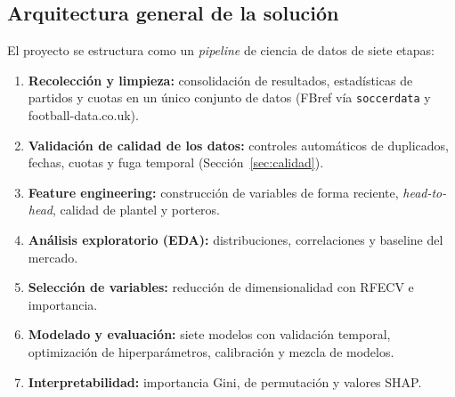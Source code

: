 \documentclass{ieeeaccess}
\begin{document}
\subsection{Arquitectura general de la solución}
El proyecto se estructura como un \textit{pipeline} de ciencia de datos de siete etapas:
\begin{enumerate}
\item \textbf{Recolección y limpieza:} consolidación de resultados, estadísticas de partidos y cuotas en un único conjunto de datos (FBref vía \texttt{soccerdata} y football-data.co.uk).
\item \textbf{Validación de calidad de los datos:} controles automáticos de duplicados, fechas, cuotas y fuga temporal (Sección~\ref{sec:calidad}).
\item \textbf{Feature engineering:} construcción de variables de forma reciente, \textit{head-to-head}, calidad de plantel y porteros.
\item \textbf{Análisis exploratorio (EDA):} distribuciones, correlaciones y baseline del mercado.
\item \textbf{Selección de variables:} reducción de dimensionalidad con RFECV e importancia.
\item \textbf{Modelado y evaluación:} siete modelos con validación temporal, optimización de hiperparámetros, calibración y mezcla de modelos.
\item \textbf{Interpretabilidad:} importancia Gini, de permutación y valores SHAP.
\end{enumerate}
\end{document}
